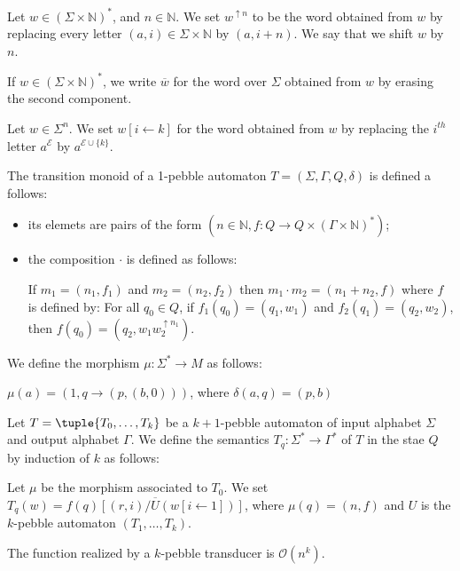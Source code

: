 \begin{definition}
Let $w\in (\Sigma\times \mathbb{N})^*$, and $n\in \mathbb{N}$.
 We set $w^{\uparrow n}$ to be the word obtained from $w$ by replacing every letter $(a,i)\in \Sigma\times \mathbb{N}$ by $(a,i+n)$. We say that we shift $w$ by $n$. 

If $w\in (\Sigma\times \mathbb{N})^*$, we write $\overline{w}$ for the word over $\Sigma$ obtained from $w$ by erasing the second component.

Let $w\in \Sigma^n$. We set $w[i\leftarrow k]$ for the word obtained from $w$ by replacing the $i^{th}$ letter $a^\mathcal{E}$ by $a^{\mathcal{E} \cup\{k\}}$.
\end{definition}

\begin{definition}
The transition monoid of a 1-pebble automaton $T=(\Sigma,\Gamma,Q, \delta)$ is defined a follows:
\begin{itemize}
\item its elemets are pairs of the form $(n\in\mathbb{N}, f:Q\to Q\times(\Gamma\times\mathbb{N})^*)$;
\item the composition $\cdot$ is defined as follows:

If $m_1=(n_1,f_1)$  and $m_2=(n_2, f_2)$ then  $m_1\cdot m_2=(n_1+n_2, f)$ where $f$ is defined by:
For all $q_0\in Q$, if $f_1(q_0)=(q_1, w_1)$ and $f_2(q_1)=(q_2, w_2)$, then $f(q_0)=(q_2, w_1w_2^{\uparrow n_1})$.
\end{itemize} 
We define the morphism $\mu:\Sigma^*\to M$ as follows:

$\mu(a)=(1, q\to (p, (b,0)))$, where $\delta(a,q)=(p, b)$
\end{definition}

\begin{definition}
Let $T=\tuple{T_0,\dots,T_k}$ be a $k+1$-pebble automaton of input alphabet $\Sigma$ and output alphabet $\Gamma$. We define the semantics $T_q:\Sigma^*\to \Gamma^*$ of $T$ in the stae $Q$ by induction of $k$ as follows:

Let $\mu$ be the morphism associated to $T_0$.
We set $T_q(w)=\overline{f(q)[(r,i)/U(w[i\leftarrow 1])]}$, where $\mu(q)=(n,f)$ and $U$ is the $k$-pebble automaton $(T_1,\dots, T_k)$. 

 \end{definition}


\begin{proposition}[\cite{}]
The function realized by a $k$-pebble transducer is $\mathcal{O}(n^k)$.
\end{proposition}